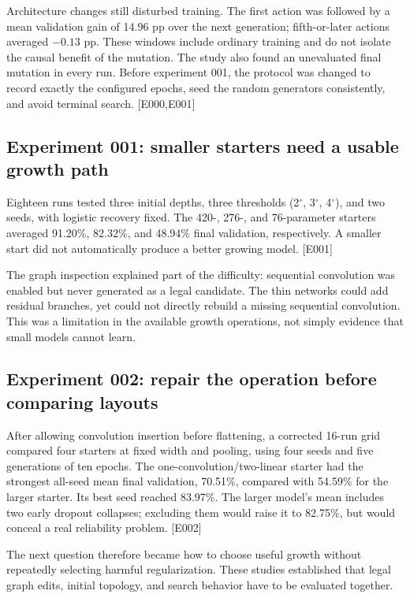 \documentclass[11pt,a4paper]{article}
\newcommand{\ev}[1]{\textcolor{ink}{\small[#1]}}
\begin{document}
Architecture changes still disturbed training. The first action was followed by a mean validation gain of 14.96 pp over the next generation; fifth-or-later actions averaged $-0.13$ pp. These windows include ordinary training and do not isolate the causal benefit of the mutation. The study also found an unevaluated final mutation in every run. Before experiment 001, the protocol was changed to record exactly the configured epochs, seed the random generators consistently, and avoid terminal search. \ev{E000,E001}

\subsection{Experiment 001: smaller starters need a usable growth path}
Eighteen runs tested three initial depths, three thresholds (2$^\circ$, 3$^\circ$, 4$^\circ$), and two seeds, with logistic recovery fixed. The 420-, 276-, and 76-parameter starters averaged 91.20\%, 82.32\%, and 48.94\% final validation, respectively. A smaller start did not automatically produce a better growing model. \ev{E001}

The graph inspection explained part of the difficulty: sequential convolution was enabled but never generated as a legal candidate. The thin networks could add residual branches, yet could not directly rebuild a missing sequential convolution. This was a limitation in the available growth operations, not simply evidence that small models cannot learn.

\subsection{Experiment 002: repair the operation before comparing layouts}
After allowing convolution insertion before flattening, a corrected 16-run grid compared four starters at fixed width and pooling, using four seeds and five generations of ten epochs. The one-convolution/two-linear starter had the strongest all-seed mean final validation, 70.51\%, compared with 54.59\% for the larger starter. Its best seed reached 83.97\%. The larger model's mean includes two early dropout collapses; excluding them would raise it to 82.75\%, but would conceal a real reliability problem. \ev{E002}

The next question therefore became how to choose useful growth without repeatedly selecting harmful regularization. These studies established that legal graph edits, initial topology, and search behavior have to be evaluated together.
\end{document}
